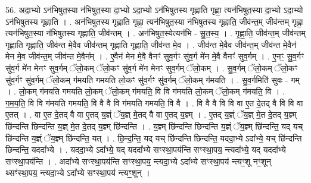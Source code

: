 \documentclass[17pt]{extarticle}
\begin{document}
56. अदा॒भ्यो ऽन॑भिषुत॒स्या न॑भिषुत॒स्या दा॒भ्यो ऽदा॒भ्यो ऽन॑भिषुतस्य गृह्णाति गृह्णा॒ त्यन॑भिषुत॒स्या दा॒भ्यो ऽदा॒भ्यो ऽन॑भिषुतस्य गृह्णाति । . अन॑भिषुतस्य गृह्णाति गृह्णा॒ त्यन॑भिषुत॒स्या न॑भिषुतस्य गृह्णाति॒ जीव॑न्त॒म् जीव॑न्तम् गृह्णा॒ त्यन॑भिषुत॒स्या न॑भिषुतस्य गृह्णाति॒ जीव॑न्तम् । . अन॑भिषुत॒स्येत्यन॑भि - सु॒त॒स्य॒ । . गृ॒ह्णा॒ति॒ जीव॑न्त॒म् जीव॑न्तम् गृह्णाति गृह्णाति॒ जीव॑न्त मे॒वैव जीव॑न्तम् गृह्णाति गृह्णाति॒ जीव॑न्त मे॒व । . जीव॑न्त मे॒वैव जीव॑न्त॒म् जीव॑न्त मे॒वैन॑ मेन मे॒व जीव॑न्त॒म् जीव॑न्त मे॒वैन᳚म् । . ए॒वैन॑ मेन मे॒वै वैनꣳ॑ सुव॒र्गꣳ सु॑व॒र्ग मे॑न मे॒वै वैनꣳ॑ सुव॒र्गम् । . ए॒नꣳ॒॒ सु॒व॒र्गꣳ सु॑व॒र्ग मे॑न मेनꣳ सुव॒र्गम् ॅलो॒कम् ॅलो॒कꣳ सु॑व॒र्ग मे॑न मेनꣳ सुव॒र्गम् ॅलो॒कम् । . सु॒व॒र्गम् ॅलो॒कम् ॅलो॒कꣳ सु॑व॒र्गꣳ सु॑व॒र्गम् ॅलो॒कम् ग॑मयति गमयति लो॒कꣳ सु॑व॒र्गꣳ सु॑व॒र्गम् ॅलो॒कम् ग॑मयति । . सु॒व॒र्गमिति॑ सुवः - गम् । . लो॒कम् ग॑मयति गमयति लो॒कम् ॅलो॒कम् ग॑मयति॒ वि वि ग॑मयति लो॒कम् ॅलो॒कम् ग॑मयति॒ वि । . ग॒म॒य॒ति॒ वि वि ग॑मयति गमयति॒ वि वै वै वि ग॑मयति गमयति॒ वि वै । . वि वै वै वि वि वा ए॒त दे॒तद् वै वि वि वा ए॒तत् । . वा ए॒त दे॒तद् वै वा ए॒तद् य॒ज्ञ्ं ॅय॒ज्ञ् मे॒तद् वै वा ए॒तद् य॒ज्ञ्म् । . ए॒तद् य॒ज्ञ्ं ॅय॒ज्ञ् मे॒त दे॒तद् य॒ज्ञ्म् छि॑न्दन्ति छिन्दन्ति य॒ज्ञ् मे॒त दे॒तद् य॒ज्ञ्म् छि॑न्दन्ति । . य॒ज्ञ्म् छि॑न्दन्ति छिन्दन्ति य॒ज्ञ्ं ॅय॒ज्ञ्म् छि॑न्दन्ति॒ यद् यच् छि॑न्दन्ति य॒ज्ञ्ं ॅय॒ज्ञ्म् छि॑न्दन्ति॒ यत् । . छि॒न्द॒न्ति॒ यद् यच् छि॑न्दन्ति छिन्दन्ति॒ यददा॒भ्ये ऽदा᳚भ्ये॒ यच् छि॑न्दन्ति छिन्दन्ति॒ यददा᳚भ्ये । . यददा॒भ्ये ऽदा᳚भ्ये॒ यद् यददा᳚भ्ये सꣳस्था॒पय॑न्ति सꣳस्था॒पय॒ न्त्यदा᳚भ्ये॒ यद् यददा᳚भ्ये सꣳस्था॒पय॑न्ति । . अदा᳚भ्ये सꣳस्था॒पय॑न्ति सꣳस्था॒पय॒ न्त्यदा॒भ्ये ऽदा᳚भ्ये सꣳस्था॒पय॑ न्त्यꣳ॒॒शू नꣳ॒॒शून् थ्सꣳ॑स्था॒पय॒ न्त्यदा॒भ्ये ऽदा᳚भ्ये सꣳस्था॒पय॑ न्त्यꣳ॒॒शून् । \newline
\end{document}
